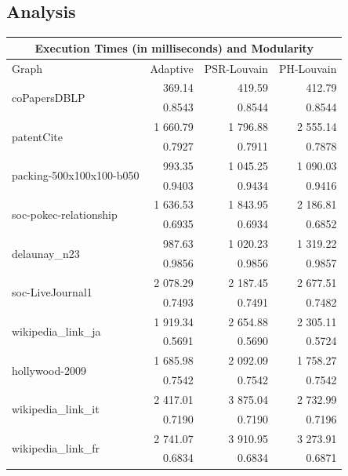 \subsection{Analysis}
\begin{table}[h]
	\centering
	\begin{tabular}{ |l||r||r|r|}
		\hline
		\multicolumn{4}{|c|}{Execution Times (in milliseconds) and Modularity} \\
		\hline
		Graph & Adaptive & PSR-Louvain & PH-Louvain \\
		\hline
		\multirow{ 2}{*}{coPapersDBLP}				& 369.14 	&  419.59  	&  412.79 \\
													& 0.8543 	&  0.8544  	&  0.8544 \\\hline
		\multirow{ 2}{*}{patentCite} 				& 1 660.79	& 1 796.88 	& 2 555.14 \\
													& 0.7927	& 0.7911   	& 0.7878 \\\hline
		\multirow{ 2}{*}{packing-500x100x100-b050}	& 993.35    & 1 045.25 	& 1 090.03 \\
													& 0.9403	& 0.9434 	& 0.9416 \\\hline
		\multirow{ 2}{*}{soc-pokec-relationship}	& 1 636.53	& 1 843.95 	& 2 186.81 \\ 
													& 0.6935 	& 0.6934 	& 0.6852 \\ \hline
		\multirow{ 2}{*}{delaunay\_n23 }			& 987.63 	& 1 020.23 	& 1 319.22 \\
													& 0.9856 	& 0.9856 	& 0.9857 \\\hline
		\multirow{ 2}{*}{soc-LiveJournal1}			& 2 078.29  & 2 187.45 	& 2 677.51 \\
													& 0.7493 	& 0.7491 	& 0.7482 \\\hline
		\multirow{ 2}{*}{wikipedia\_link\_ja} 		& 1 919.34  & 2 654.88 	& 2 305.11 \\
													& 0.5691	& 0.5690 	& 0.5724 \\\hline
		\multirow{ 2}{*}{hollywood-2009} 			& 1 685.98	& 2 092.09 	& 1 758.27 \\
													& 0.7542 	& 0.7542 	& 0.7542 \\\hline
		\multirow{ 2}{*}{wikipedia\_link\_it} 		& 2 417.01	& 3 875.04 	& 2 732.99 \\
													& 0.7190	& 0.7190 	& 0.7196 \\\hline
		\multirow{ 2}{*}{wikipedia\_link\_fr} 		& 2 741.07 	& 3 910.95 	& 3 273.91 \\
													& 0.6834	& 0.6834 	& 0.6871 \\\hline

\end{tabular}
\end{table}
